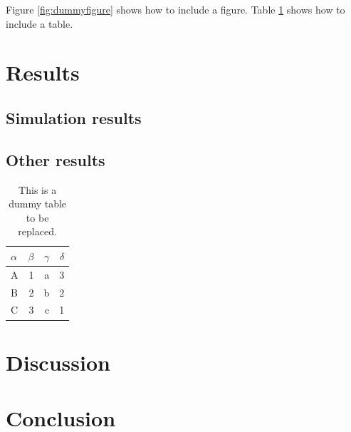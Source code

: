 Figure \ref{fig:dummyfigure} shows how to include a figure.
Table \ref{tab:dummytable} shows how to include a table.

\bigskip

\lipsum[2-3]

\section{Results}
\subsection{Simulation results}

\lipsum[2]

\subsection{Other results}
\lipsum[2]

\begin{table}
  \centering
  \begin{tabular}{lrrr}
  \toprule
  $\alpha$   & $\beta$ & $\gamma$ & $\delta$ \\
  \midrule
  A          & 1       & a        & 3        \\
  B          & 2       & b        & 2        \\
  C          & 3       & c        & 1        \\
  \bottomrule
  \end{tabular}
  \caption{This is a dummy table to be replaced.}
  \label{tab:dummytable}
\end{table}



\section{Discussion}
\lipsum[2]


\section{Conclusion}
\lipsum[2]


